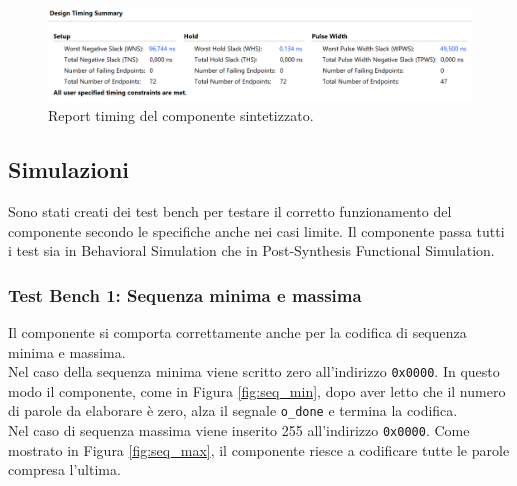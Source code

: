 \documentclass[fleqn,11pt]{article}
\begin{document}
\begin{figure}[h]
    \centering
    \includegraphics[width=\textwidth]{timing}
    \caption{Report timing del componente sintetizzato.}
    \label{fig:time}
\end{figure}

\subsection{Simulazioni}
Sono stati creati dei test bench per testare il corretto funzionamento del componente secondo le specifiche anche nei casi limite. Il componente passa tutti i test sia in Behavioral Simulation che in Post-Synthesis Functional Simulation.

\subsubsection{Test Bench 1: Sequenza minima e massima}
Il componente si comporta correttamente anche per la codifica di sequenza minima e massima.\\
Nel caso della sequenza minima viene scritto zero all'indirizzo \verb|0x0000|. In questo modo il componente, come in Figura \ref{fig:seq_min}, dopo aver letto che il numero di parole da elaborare è zero, alza il segnale \verb|o_done| e termina la codifica.\\
Nel caso di sequenza massima viene inserito 255 all'indirizzo \verb|0x0000|. Come mostrato in Figura \ref{fig:seq_max}, il componente riesce a codificare tutte le parole compresa l'ultima.
\end{document}
